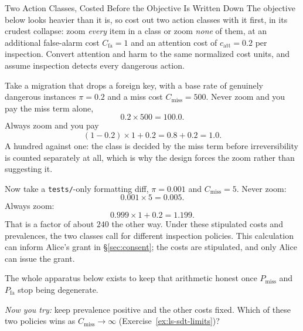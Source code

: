 \documentclass[11pt,a4paper]{article}
\theoremstyle{definition}
\theoremstyle{plain}
\begin{document}
\begin{pdexample}{Two Action Classes, Costed Before the Objective Is Written Down}
\setlength{\parskip}{4pt plus 1pt}
The objective below looks heavier than it is, so cost out two action classes with it first, in its crudest collapse: zoom \emph{every} item in a class or zoom \emph{none} of them, at an additional false-alarm cost $C_{\text{fa}}=1$ and an attention cost of $c_{\mathrm{att}}=0.2$ per inspection. Convert attention and harm to the same
normalized cost units, and assume inspection detects every dangerous action.

Take a migration that drops a foreign key, with a base rate of genuinely dangerous instances $\pi=0.2$ and a miss cost $C_{\text{miss}}=500$. Never zoom and you pay the miss term alone,
\[
0.2\times 500 = 100.0.
\]
Always zoom and you pay
\[
(1-0.2)\times 1 + 0.2 = 0.8+0.2 = 1.0.
\]
A hundred against one: the class is decided by the miss term before irreversibility is counted separately at all, which is why the design forces the zoom rather than suggesting it.

Now take a \texttt{tests/}-only formatting diff, $\pi=0.001$ and $C_{\text{miss}}=5$. Never zoom:
\[
0.001\times 5 = 0.005.
\]
Always zoom:
\[
0.999\times 1 + 0.2 = 1.199.
\]
That is a factor of about $240$ the other way. Under these stipulated costs and prevalences, the two classes call for different inspection policies. This calculation can inform Alice's grant in \S\ref{sec:consent}; the costs are stipulated, and only Alice can issue the grant.

The whole apparatus below exists to keep that arithmetic honest once $P_{\text{miss}}$ and $P_{\text{fa}}$ stop being degenerate.

\emph{Now you try:} keep prevalence positive and the other costs fixed. Which of these two policies wins as $C_{\text{miss}}\to\infty$ (Exercise~\ref{ex:ls-sdt-limits})?
\end{pdexample}
\end{document}
